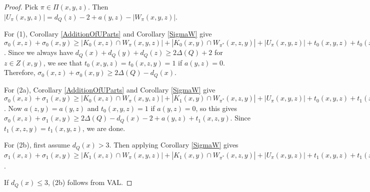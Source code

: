 \documentclass[12pt,reqno]{amsart}
\theoremstyle{plain}
\theoremstyle{definition}
\theoremstyle{remark}
\newcommand{\card}[1]{\left|#1\right|}
\begin{document}
\begin{proof}
Pick $\pi \in \Pi(x,y,z)$.  Then $\card{U_\pi(x, y, z)} = d_Q(z) - 2 + a(y, z) - \card{W_\pi(x, y, z)}$.

For (1), Corollary \ref{AdditionOfUParts} and Corollary \ref{SigmaW} give $\sigma_0(x, z) + \sigma_0(x, y) \ge \card{K_0(x, z) \cap W_\pi(x, y, z)} + \card{K_0(x, y) \cap W_{\pi^*}(x, z, y)} + \card{U_\pi(x, y, z)} + t_0(x, y, z) + t_0(x, z, y) =\card{W_\pi(x, y, z)} + \card{W_{\pi^*}(x, z, y)} + d_Q(z) - 2 + a(y, z) - \card{W_\pi(x, y, z)} + t_0(x, y, z) + t_0(x, z, y) =\card{W_{\pi^*}(x, z, y)} + d_Q(z) - 2 + a(y, z) + t_0(x, y, z) + t_0(x, z, y)
= 2\Delta(Q) - d_Q(x) - 2 + 2a(y, z) + t_0(x, y, z) + t_0(x, z, y)$. Since we always have $d_Q(x) + d_Q(y) + d_Q(z) \ge 2\Delta(Q) + 2$ for $z \in Z(x, y)$, we see that $t_0(x, y, z) = t_0(x, z, y) = 1$ if $a(y, z) = 0$.  Therefore, $\sigma_0(x, z) + \sigma_0(x, y) \ge 2\Delta(Q) - d_Q(x)$.

For (2a), Corollary \ref{AdditionOfUParts} and Corollary \ref{SigmaW} give $\sigma_0(x, z) + \sigma_1(x, y) \ge \card{K_0(x, z) \cap W_\pi(x, y, z)} + \card{K_1(x, y) \cap W_{\pi^*}(x, z, y)} + \card{U_\pi(x, y, z)} + t_0(x, y, z) + t_1(x, z, y) = \card{W_\pi(x, y, z)} + \card{K_1(x, y) \cap W_{\pi^*}(x, z, y)} + d_Q(z) - 2 + a(y, z) - \card{W_\pi(x, y, z)} + t_0(x, y, z) + t_1(x, z, y) = \card{K_1(x, y) \cap W_{\pi^*}(x, z, y)} + d_Q(z) - 2 + a(y, z) + t_0(x, y, z) + t_1(x, z, y) \ge 2\Delta(Q) - d_Q(x) - 3 + a(z, y) + a(y, z) + t_0(x, y, z) + t_1(x, z, y)$.  Now $a(z, y) = a(y, z)$ and $t_0(x, y, z) = 1$ if $a(y, z) = 0$, so this gives $\sigma_0(x, z) + \sigma_1(x, y) \ge 2\Delta(Q) - d_Q(x) - 2 + a(y, z) + t_1(x, z, y)$.  Since $t_1(x, z, y) = t_1(x, y, z)$, we are done.

For (2b), first assume $d_Q(x) > 3$.  Then applying Corollary \ref{SigmaW} gives $\sigma_1(x, z) + \sigma_1(x, y) \ge \card{K_1(x, z) \cap W_\pi(x, y, z)} + \card{K_1(x, y) \cap W_{\pi^*}(x, z, y)} + \card{U_\pi(x, y, z)} + t_1(x, y, z) + t_1(x, z, y) \ge (2\Delta(Q) - d_Q(x) - d_Q(z) - 1 + a(z, y)) + (2\Delta(Q) - d_Q(x) - d_Q(y) - 1 + a(y, z)) + (d_Q(z) - 2 + a(y, z) - \card{W_\pi(x, y, z)}) + t_1(x, y, z) + t_1(x, z, y) = (2\Delta(Q) - d_Q(x) - d_Q(z) - 1 + a(y, z)) + (-2 + a(y, z)) + (d_Q(z) - 2 + a(y, z)) + t_1(x, y, z) + t_1(x, z, y) = 2\Delta(Q) - d_Q(x) - 5 + 3a(y, z) + 2t_1(x, y, z)$. 

If $d_Q(x) \le 3$, (2b) follows from VAL.
\end{proof}
\end{document}
